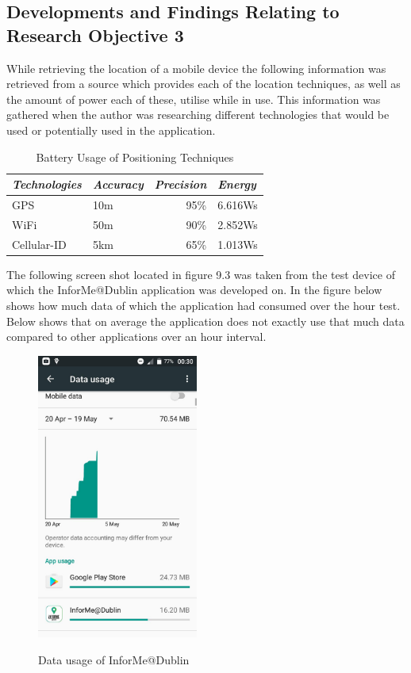 \subsection{Developments and Findings Relating to Research Objective 3}
While retrieving the location of a mobile device the following information was retrieved from a source which provides each of the location techniques, as well as the amount of power each of these, utilise while in use. This information was gathered when the author was researching different technologies that would be used or potentially used in the application.
\begin{table}[!ht]
    \centering
    \caption{Battery Usage of Positioning Techniques \cite{bareth2011energy}}
    \label{Battery Usage of Positioning Techniques}
    \begin{tabular}{@{}llrl@{}}
        \toprule
        \multicolumn{1}{c}{\textit{Technologies}} & \textit{Accuracy} & \textit{Precision} & \textit{Energy} \\ \midrule
        GPS & 10m & 95\% & 6.616Ws \\ \midrule
        WiFi & 50m & 90\% & 2.852Ws \\ \midrule
        Cellular-ID & 5km & 65\% & 1.013Ws \\ \bottomrule
    \end{tabular}
\end{table}

The following screen shot located in figure 9.3 was taken from the test device of which the InforMe@Dublin application was developed on. In the figure below shows how much data of which the application had consumed over the hour test. Below shows that on average the application does not exactly use that much data compared to other applications over an hour interval.

\begin{figure}[htbp]
    \center \includegraphics[width=150pt]{dataused}\\
    \caption{Data usage of InforMe@Dublin} \label{Figure: Data usage of InforMe@Dublin}
\end{figure}
\newpage

